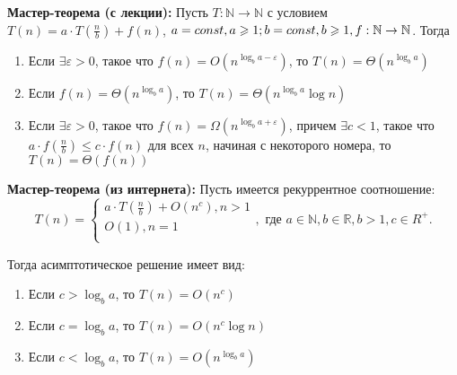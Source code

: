 \par \textbf{Мастер-теорема (с лекции):} Пусть $T: \mathbb{N} \rightarrow \mathbb{N}$ с условием $T(n)=a \cdot T(\frac{n}{b})+f(n)$, $a=const, a \geqslant 1; \\ b=const, b \geqslant 1, f: \mathbb{N} \rightarrow \mathbb{N}$. Тогда \begin{enumerate}
    \item Если $\exists \varepsilon > 0$, такое что $f(n)=O(n^{\log_b a - \varepsilon})$, то $T(n)=\Theta(n^{\log_b a})$
    \item Если $f(n)=\Theta(n^{\log_b a})$, то $T(n)=\Theta(n^{\log_b a} \log n)$
    \item Если $\exists \varepsilon > 0$, такое что $f(n)=\Omega(n^{\log_b a + \varepsilon})$, причем $\exists c < 1$, такое что $a \cdot f(\frac{n}{b}) \leqslant c \cdot f(n)$ для всех $n$, начиная с некоторого номера, то $T(n)=\Theta(f(n))$
\end{enumerate}
\par \textbf{Мастер-теорема (из интернета):} Пусть имеется рекуррентное соотношение:
$$T(n)=\left\{
\begin{array}{ccc}
a \cdot T(\frac{n}{b})+O(n^c), n>1\\
O(1),n=1\\
\end{array}
\right., \text{ где } a \in \mathbb{N}, b \in \mathbb{R}, b>1, c \in R^+.$$

Тогда асимптотическое решение имеет вид: \begin{enumerate}
    \item Если $c>\log_b a$, то $T(n)=O(n^c)$
    \item Если $c=\log_b a$, то $T(n)=O(n^c \log n)$
    \item Если $c<\log_b a$, то $T(n)=O(n^{\log_b a})$
\end{enumerate}